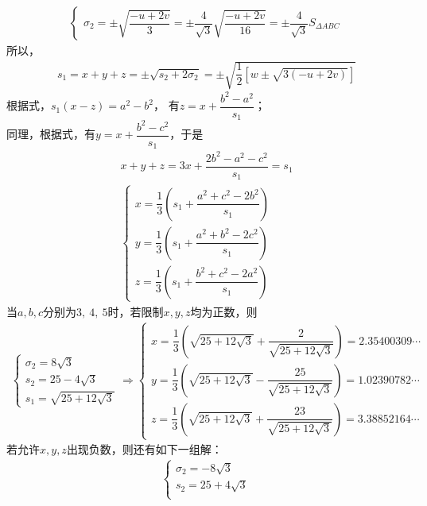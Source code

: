 \begin{enumerate}[label={【\textbf{例\thechapter.\arabic*}】},
 leftmargin=\inteval{\myenumleftmargin}pt,
 itemsep=\inteval{\myenumitempsep}pt,
 itemindent=\inteval{\myenumitemindent}pt]
\begin{align*}
\begin{cases}
        \sigma_2= \pm \sqrt{\dfrac{-u+2v}{3}}=
        \pm \dfrac{4}{\sqrt{3}}\sqrt{\dfrac{-u+2v}{16}}=
        \pm\dfrac{4}{\sqrt{3}}S_{\Delta ABC} 
    \end{cases}
\end{align*}
所以，
\begin{gather*}
    s_1=x+y+z=\pm\sqrt{s_2+2\sigma_2 }=
    \pm \sqrt{\dfrac{1}{2}[w\pm\sqrt{3(-u+2v)}]}
\end{gather*}
根据式，$ s_1(x-z)=a^2-b^2 $，
有$ z=x+\dfrac{b^2-a^2}{s_1} $；\\
同理，根据式，有$ y=x+\dfrac{b^2-c^2}{s_1} $，于是
\begin{gather*}
    x+y+z=3x+\dfrac{2b^2-a^2-c^2}{s_1}=s_1 \\
    \begin{cases}
        x=\dfrac{1}{3}\left(s_1+\dfrac{a^2+c^2-2b^2}{s_1}\right)\\[3mm]
        y=\dfrac{1}{3}\left(s_1+\dfrac{a^2+b^2-2c^2}{s_1}\right)\\[3mm]
        z=\dfrac{1}{3}\left(s_1+\dfrac{b^2+c^2-2a^2}{s_1}\right)
    \end{cases}
\end{gather*}
当$ a,b,c $分别为$ 3,\ 4,\ 5 $时，若限制$ x,y,z $均为正数，则
\begin{gather*}
\begin{cases}
    \sigma_2 =8\sqrt{3} \\        
    s_2 =25- 4\sqrt{3} \\
    s_1=\sqrt{25 + 12\sqrt{3}}
\end{cases}
\Rightarrow 
\begin{cases}
    x =\dfrac{1}{3}\left(\sqrt{25 + 12\sqrt{3}}+
    \dfrac{2}{\sqrt{25 + 12\sqrt{3}}}\right)=2.35400309 \cdots\\
    y =\dfrac{1}{3}\left(\sqrt{25 + 12\sqrt{3}}-
    \dfrac{25}{\sqrt{25 + 12\sqrt{3}}}\right)= 1.02390782 \cdots\\
    z =\dfrac{1}{3}\left(\sqrt{25 + 12\sqrt{3}}+
    \dfrac{23}{\sqrt{25 + 12\sqrt{3}}}\right)= 3.38852164 \cdots 
\end{cases}
\end{gather*}
若允许$ x,y,z $出现负数，则还有如下一组解：
\begin{align*}
    \begin{cases}
        \sigma_2 = -8\sqrt{3} \\        
        s_2 = 25+ 4\sqrt{3} \\

\end{cases}
\end{align*}
\end{enumerate}
